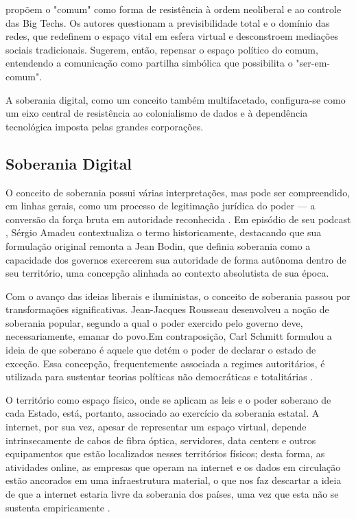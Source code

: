  propõem o "comum" como forma de resistência à ordem neoliberal e ao controle das Big Techs. Os autores questionam a previsibilidade total e o domínio das redes, que redefinem o espaço vital em esfera virtual e desconstroem mediações sociais tradicionais. Sugerem, então, repensar o espaço político do comum, entendendo a comunicação como partilha simbólica que possibilita o "ser-em-comum".

A soberania digital, como um conceito também multifacetado, configura-se como um eixo central de resistência ao colonialismo de dados e à dependência tecnológica imposta pelas grandes corporações.

\subsection{Soberania Digital}
\label{subsec:soberania}
O conceito de soberania possui várias interpretações, mas pode ser compreendido, em linhas gerais, como um processo de legitimação jurídica do poder — a conversão da força bruta em autoridade reconhecida \cite{lemos2024}. Em episódio de seu podcast , Sérgio Amadeu contextualiza o termo historicamente, destacando que sua formulação original remonta a Jean Bodin, que definia soberania como a capacidade dos governos exercerem sua autoridade de forma autônoma dentro de seu território, uma concepção alinhada ao contexto absolutista de sua época.

Com o avanço das ideias liberais e iluministas, o conceito de soberania passou por transformações significativas. Jean-Jacques Rousseau desenvolveu a noção de soberania popular, segundo a qual o poder exercido pelo governo deve, necessariamente, emanar do povo.Em contraposição, Carl Schmitt formulou a ideia de que soberano é aquele que detém o poder de declarar o estado de exceção. Essa concepção, frequentemente associada a regimes autoritários, é utilizada para sustentar teorias políticas não democráticas e totalitárias \cite{tecnopolitica2023}.


O território como espaço físico, onde se aplicam as leis e o poder soberano de cada Estado, está, portanto, associado ao exercício da soberania estatal. A internet, por sua vez, apesar de representar um espaço virtual,  depende intrinsecamente de cabos de fibra óptica, servidores, data centers e outros equipamentos que estão localizados nesses territórios físicos; desta forma, as atividades online, as empresas que operam na internet e os dados em circulação estão ancorados em uma infraestrutura material, o que nos faz descartar a ideia de que a internet estaria livre da soberania dos países, uma vez que esta não se sustenta empiricamente  \cite{tecnopolitica2023}.


